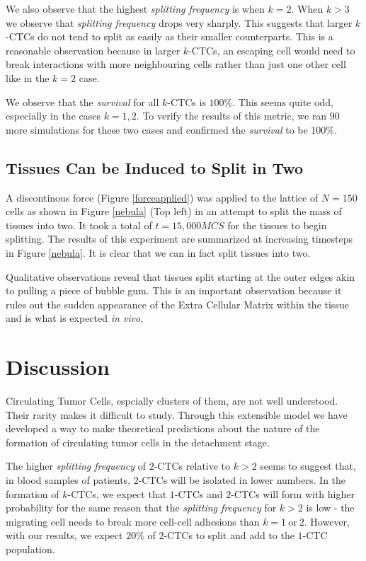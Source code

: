 \documentclass[12pt]{article}
\begin{document}
We also observe that the highest \emph{splitting frequency} is when $k=2$. When $k>3$ we observe that \emph{splitting frequency} drops very sharply. This suggests that larger $k$-CTCs do not tend to split as easily as their smaller counterparts. This is a reasonable observation because in larger $k$-CTCs, an escaping cell would need to break interactions with more neighbouring cells rather than just one other cell like in the $k=2$ case.

We observe that the \emph{survival} for all $k$-CTCs is $100\%$. This seems quite odd, especially in the cases $k=1,2$. To verify the results of this metric, we ran $90$ more simulations for these two cases and confirmed the \emph{survival} to be $100\%$.

\subsection{Tissues Can be Induced to Split in Two}
A discontinous force (Figure \ref{forceapplied}) was applied to the lattice of $N=150$ cells as shown in Figure \ref{nebula} (Top left) in an attempt to split the mass of tissues into two. It took a total of $t=15,000MCS$ for the tissues to begin splitting. The results of this experiment are summarized at increasing timesteps in Figure \ref{nebula}. It is clear that we can in fact split tissues into two.

Qualitative observations reveal that tissues split starting at the outer edges akin to pulling a piece of bubble gum. This is an important observation because it rules out the sudden appearance of the Extra Cellular Matrix within the tissue and is what is expected \emph{in vivo}.
\section{Discussion}
Circulating Tumor Cells, espcially clusters of them, are not well understood. Their rarity makes it difficult to study. Through this extensible model we have developed a way to make theoretical predictions about the nature of the formation of circulating tumor cells in the detachment stage. 

The higher \emph{splitting frequency} of $2$-CTCs relative to $k>2$ seems to suggest that, in blood samples of patients, $2$-CTCs will be isolated in lower numbers. In the formation of $k$-CTCs, we expect that $1$-CTCs and $2$-CTCs will form with higher probability for the same reason that the \emph{splitting frequency} for $k>2$ is low - the migrating cell needs to break more cell-cell adhesions than $k=1~\text{or}~2$. However, with our results, we expect $20\%$ of $2$-CTCs to split and add to the $1$-CTC population.
\end{document}
